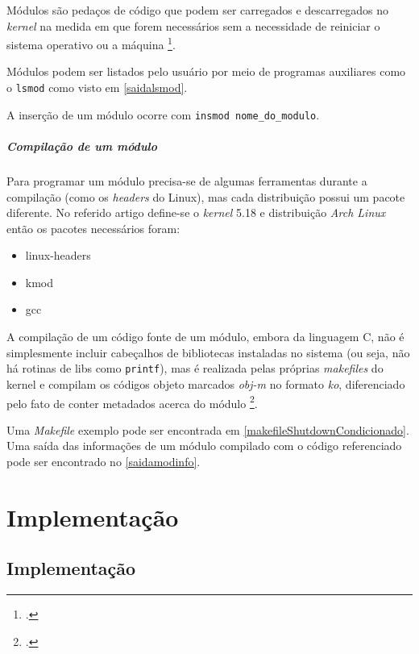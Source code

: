 \documentclass[
	12pt,			
	openright,			%
	twoside,			%
	a4paper,			%
	english,			%
	brazil,				%
	]{abntex2}
\begin{document}
Módulos são pedaços de código que podem ser carregados e descarregados no \emph{kernel}
na medida em que forem necessários sem a necessidade de reiniciar o sistema
operativo ou a máquina \footcite{pomerantzsalzmanburianmottramhuang2022}.

Módulos podem ser listados pelo usuário por meio de programas auxiliares como
o \lstinline{lsmod} como visto em \autoref{saidalsmod}. 

A inserção de um módulo ocorre com \lstinline{insmod nome_do_modulo}.

\subsubsection{Compilação de um módulo}

Para programar um módulo precisa-se de algumas ferramentas durante a compilação
(como os \emph{headers} do Linux), mas cada distribuição possui um pacote
diferente. No referido artigo define-se o \emph{kernel} 5.18 e distribuição
\emph{Arch Linux} então os pacotes necessários foram:

\begin{itemize}
    \item{linux-headers}
    \item{kmod}
    \item{gcc}
\end{itemize}

A compilação de um código fonte de um módulo, embora da linguagem C, não é
simplesmente incluir cabeçalhos de bibliotecas instaladas no sistema (ou seja,
não há rotinas de libs como \lstinline{printf}), mas é realizada pelas próprias
\emph{makefiles} do kernel e compilam os códigos objeto marcados \emph{obj-m} no
formato \emph{ko}, diferenciado pelo fato de conter metadados acerca do módulo
\footcite{compilingKernelModules}.

Uma \emph{Makefile} exemplo pode ser encontrada em
\autoref{makefileShutdownCondicionado}. Uma saída das informações de um módulo compilado 
com o código referenciado pode ser encontrado no \autoref{saidamodinfo}.

\part{Implementação}

\chapter{Implementação}
\end{document}
